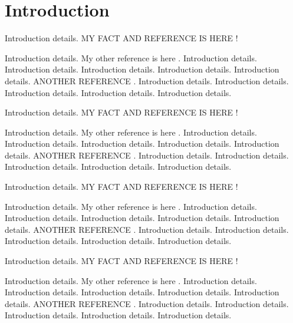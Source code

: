 
\section{Introduction}



\color{red}
Introduction details. MY FACT AND REFERENCE IS HERE \cite{yu2018qphos}! 

Introduction details. 
My other reference is here \cite{atkins2018computer}. Introduction details. Introduction details. Introduction details. Introduction details. Introduction details. ANOTHER REFERENCE \cite{conrad-gecco-selection-study}. Introduction details. Introduction details. Introduction details. Introduction details. Introduction details. 

\color{black}
Introduction details. MY FACT AND REFERENCE IS HERE \cite{yu2018qphos}! 

\color{green}
Introduction details. 
My other reference is here \cite{atkins2018computer}. Introduction details. Introduction details. Introduction details. Introduction details. Introduction details. ANOTHER REFERENCE \cite{conrad-gecco-selection-study}. Introduction details. Introduction details. Introduction details. Introduction details. Introduction details. 
\color{black}

Introduction details. MY FACT AND REFERENCE IS HERE \cite{yu2018qphos}! 

Introduction details. 
My other reference is here \cite{atkins2018computer}. Introduction details. Introduction details. Introduction details. Introduction details. Introduction details. ANOTHER REFERENCE \cite{conrad-gecco-selection-study}. Introduction details. Introduction details. Introduction details. Introduction details. Introduction details. 


Introduction details. MY FACT AND REFERENCE IS HERE \cite{yu2018qphos}! 

Introduction details. 
My other reference is here \cite{atkins2018computer}. Introduction details. Introduction details. Introduction details. Introduction details. Introduction details. ANOTHER REFERENCE \cite{conrad-gecco-selection-study}. Introduction details. Introduction details. Introduction details. Introduction details. Introduction details. 


